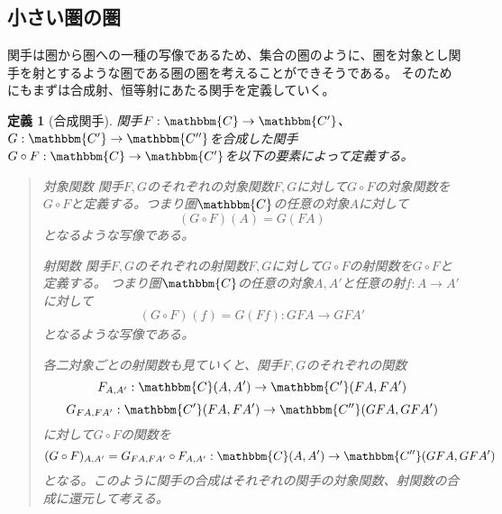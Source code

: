 \documentclass[uplatex,dvipdfmx]{jsarticle}
\newcommand{\cat}[1]{\mathbbm{#1}}
\newcommand{\arrow}{\rightarrow}
\newcommand{\functor}[3]{#1:\cat{#2}\arrow \cat{#3}}
\newcommand{\mor}[3]{#1:#2\arrow #3}
\newcommand{\arset}[3]{\cat{#1}(#2,#3)}
\newtheorem{define}[proof]{定義}
\numberwithin{proof}{subsection}
\newenvironment{mydescription}
{\begin{description}
  \setlength{\parskip}{0.5cm}
}
{\end{description}}
\begin{document}
	\subsection{小さい圏の圏}
	関手は圏から圏への一種の写像であるため、集合の圏のように、圏を対象とし関手を射とするような圏である圏の圏を考えることができそうである。
	そのためにもまずは合成射、恒等射にあたる関手を定義していく。
	\begin{define}[合成関手]
		関手$\functor{F}{C}{C'}$、$\functor{G}{C'}{C''}$を合成した関手$\functor{G\circ F}{C}{C'}$を以下の要素によって定義する。
		\begin{quote}
			\begin{mydescription}
			\item[対象関数]関手$F,G$のそれぞれの対象関数$F,G$に対して$G\circ F$の対象関数を$G\circ F$と定義する。つまり圏$\cat{C}$の任意の対象$A$に対して\[(G\circ F)(A)=G(FA)\]となるような写像である。
			\item[射関数]関手$F,G$のそれぞれの射関数$F,G$に対して$G\circ F$の射関数を$G\circ F$と定義する。
			つまり圏$\cat{C}$の任意の対象$A,A'$と任意の射$\mor{f}{A}{A'}$に対して\[\mor{(G\circ F)_{}(f)=G(Ff)}{GFA}{GF{A'}}\]となるような写像である。

			各二対象ごとの射関数も見ていくと、関手$F,G$のそれぞれの関数\[\mor{F_{A,A'}}{\arset{C}{A}{A'}}{\arset{C'}{FA}{FA'}}\]\[\mor{G_{FA,FA'}}{\arset{C'}{FA}{FA'}}{\arset{C''}{GFA}{GFA'}}\]に対して$G\circ F$の関数を\[(G\circ F)_{A,A'}=\mor{G_{FA,FA'}\circ F_{A,A'}}{\arset{C}{A}{A'}}{\arset{C''}{GFA}{GFA'}}\]となる。このように関手の合成はそれぞれの関手の対象関数、射関数の合成に還元して考える。

			\begin{center}
\end{center}
\end{mydescription}
\end{quote}
\end{define}
\end{document}

